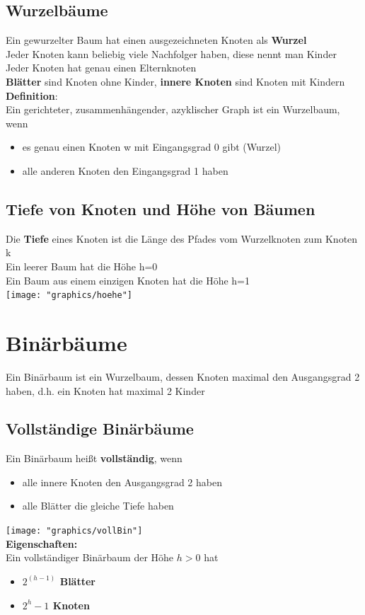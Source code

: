 \documentclass{scrreprt}
\begin{document}
\subsection{Wurzelbäume}
Ein gewurzelter Baum hat einen ausgezeichneten Knoten als \textbf{Wurzel}
\\Jeder Knoten kann beliebig viele Nachfolger haben, diese nennt man Kinder
\\Jeder Knoten hat genau einen Elternknoten
\\\textbf{Blätter} sind Knoten ohne Kinder, \textbf{innere Knoten} sind Knoten mit Kindern
\\\textbf{Definition}:\\
Ein gerichteter, zusammenhängender, azyklischer Graph ist ein Wurzelbaum, wenn
\begin{itemize}
    \item es genau einen Knoten w mit Eingangsgrad 0 gibt (Wurzel)
    \item alle anderen Knoten den Eingangsgrad 1 haben
\end{itemize}
\subsection{Tiefe von Knoten und Höhe von Bäumen}
Die \textbf{Tiefe} eines Knoten ist die Länge des Pfades vom Wurzelknoten zum Knoten k
\\Ein leerer Baum hat die Höhe h=0
\\Ein Baum aus einem einzigen Knoten hat die Höhe h=1\\
\texttt{[image: "graphics/hoehe"]}
\section{Binärbäume}
Ein Binärbaum ist ein Wurzelbaum, dessen Knoten maximal den Ausgangsgrad 2 haben,
d.h. ein Knoten hat maximal 2 Kinder
\subsection{Vollständige Binärbäume}
Ein Binärbaum heißt \textbf{vollständig}, wenn
\begin{itemize}
    \item alle innere Knoten den Ausgangsgrad 2 haben
    \item alle Blätter die gleiche Tiefe haben
\end{itemize}
\texttt{[image: "graphics/vollBin"]}
\\\textbf{Eigenschaften:}
\\Ein vollständiger Binärbaum der Höhe $h>0$ hat
\begin{itemize}
    \item \textbf{$2^{(h-1)}$ Blätter}
    \item \textbf{$2^{h}-1$ Knoten}
\end{itemize}
\end{document}

